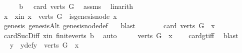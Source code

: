 \begin{isabellebody}
\isamarkupfalse%
\ {\isacharminus}{\kern0pt}\isanewline
\ \ \isamarkupfalse%
\ b{}{\isacharcolon}{\kern0pt}\ {\isachardoublequoteopen}{}\ {\isacharless}{\kern0pt}\ card\ {\isacharparenleft}{\kern0pt}verts\ G{\isacharparenright}{\kern0pt}{\isachardoublequoteclose}\ \isamarkupfalse%
\ assms\ \isamarkupfalse%
\ linarith\isanewline
\ \ \isamarkupfalse%
\ x\ \ x{\isacharunderscore}{\kern0pt}in{\isacharcolon}{\kern0pt}\ {\isachardoublequoteopen}x\ {\isasymin}\ {\isacharparenleft}{\kern0pt}verts\ G{\isacharparenright}{\kern0pt}\ {\isasymand}\ is{\isacharunderscore}{\kern0pt}genesis{\isacharunderscore}{\kern0pt}node\ x{\isachardoublequoteclose}\ \isanewline
\ \ \ \ \isamarkupfalse%
\ genesis\ genesisAlt\ genesis{\isacharunderscore}{\kern0pt}node{\isacharunderscore}{\kern0pt}def\ \ \isamarkupfalse%
\ blast\isanewline
\ \ \isamarkupfalse%
\ \isamarkupfalse%
\ {\isachardoublequoteopen}{}\ {\isacharless}{\kern0pt}\ card\ {\isacharparenleft}{\kern0pt}{\isacharparenleft}{\kern0pt}verts\ G{\isacharparenright}{\kern0pt}\ {\isacharminus}{\kern0pt}\ {\isacharbraceleft}{\kern0pt}x{\isacharbraceright}{\kern0pt}{\isacharparenright}{\kern0pt}{\isachardoublequoteclose}\ \isamarkupfalse%
\ card{\isacharunderscore}{\kern0pt}Suc{\isacharunderscore}{\kern0pt}Diff{}\ x{\isacharunderscore}{\kern0pt}in\ finite{\isacharunderscore}{\kern0pt}verts\ b{}\ \isamarkupfalse%
\ auto\isanewline
\ \ \isamarkupfalse%
\ \isamarkupfalse%
\ {\isachardoublequoteopen}{\isacharparenleft}{\kern0pt}{\isacharparenleft}{\kern0pt}verts\ G{\isacharparenright}{\kern0pt}\ {\isacharminus}{\kern0pt}\ {\isacharbraceleft}{\kern0pt}x{\isacharbraceright}{\kern0pt}{\isacharparenright}{\kern0pt}\ {\isasymnoteq}\ {\isacharbraceleft}{\kern0pt}{\isacharbraceright}{\kern0pt}{\isachardoublequoteclose}\ \isamarkupfalse%
\ card{\isacharunderscore}{\kern0pt}gt{\isacharunderscore}{\kern0pt}{}{\isacharunderscore}{\kern0pt}iff\ \isamarkupfalse%
\ blast\isanewline
\ \ \isamarkupfalse%
\ \isamarkupfalse%
\ y\ \ y{\isacharunderscore}{\kern0pt}def{\isacharcolon}{\kern0pt}{\isachardoublequoteopen}y\ {\isasymin}\ {\isacharparenleft}{\kern0pt}verts\ G{\isacharparenright}{\kern0pt}\ {\isacharminus}{\kern0pt}\ {\isacharbraceleft}{\kern0pt}x{\isacharbraceright}{\kern0pt}{\isachardoublequoteclose}\ \isamarkupfalse%

\end{isabellebody}
